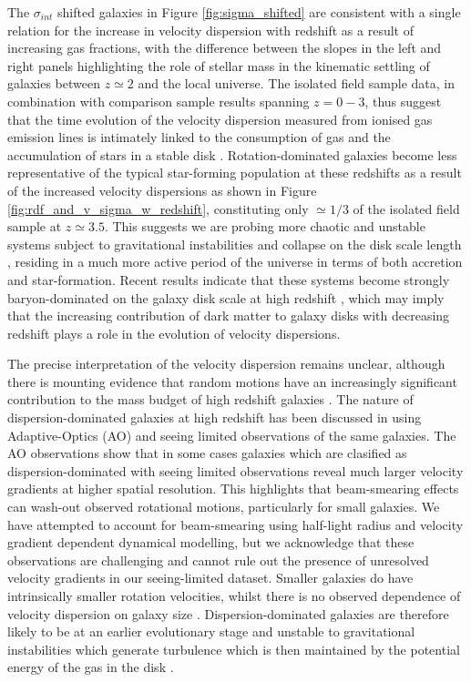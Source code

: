 \documentclass[fleqn,usenatbib]{mn2e}
\begin{document}
The $\sigma_{int}$ shifted galaxies in Figure \ref{fig:sigma_shifted} are consistent with a single relation for the increase in velocity dispersion with redshift as a result of increasing gas fractions, with the difference between the slopes in the left and right panels highlighting the role of stellar mass in the kinematic settling of galaxies between $z\simeq2$ and the local universe. 
The isolated field sample data, in combination with comparison sample results spanning $z=0-3$, thus suggest that the time evolution of the velocity dispersion measured from ionised gas emission lines is intimately linked to the consumption of gas and the accumulation of stars in a stable disk \citep[e.g.][]{Law2009,Law2012b,Law2012c,Wisnioski2015}.
Rotation-dominated galaxies become less representative of the typical star-forming population at these redshifts as a result of the increased velocity dispersions as shown in Figure \ref{fig:rdf_and_v_sigma_w_redshift}, constituting only $\simeq1/3$ of the isolated field sample at $z\simeq3.5$.
This suggests we are probing more chaotic and unstable systems subject to gravitational instabilities and collapse on the disk scale length \citep{Burkert2010,Genzel2011}, residing in a much more active period of the universe in terms of both accretion and star-formation.
Recent results indicate that these systems become strongly baryon-dominated on the galaxy disk scale at high redshift \citep{Ubler2017,Lang2017,Genzel2017}, which may imply that the increasing contribution of dark matter to galaxy disks with decreasing redshift plays a role in the evolution of velocity dispersions.   

The precise interpretation of the velocity dispersion remains unclear, although there is mounting evidence that random motions have an increasingly significant contribution to the mass budget of high redshift galaxies \citep[e.g.][]{Kassin2007,Law2009,Burkert2010,Kassin2012,Wuyts2016b,Lang2017,Ubler2017,Genzel2017}.
The nature of dispersion-dominated galaxies at high redshift has been discussed in \cite{Newman2013} using Adaptive-Optics (AO) and seeing limited observations of the same galaxies.
The AO observations show that in some cases galaxies which are clasified as dispersion-dominated with seeing limited observations reveal much larger velocity gradients at higher spatial resolution.
This highlights that beam-smearing effects can wash-out observed rotational motions, particularly for small galaxies.
We have attempted to account for beam-smearing using half-light radius and velocity gradient dependent dynamical modelling, but we acknowledge that these observations are challenging and cannot rule out the presence of unresolved velocity gradients in our seeing-limited dataset.
Smaller galaxies do have intrinsically smaller rotation velocities, whilst there is no observed dependence of velocity dispersion on galaxy size \citep[e.g.][]{Newman2013}.
Dispersion-dominated galaxies are therefore likely to be at an earlier evolutionary stage and unstable to gravitational instabilities which generate turbulence which is then maintained by the potential energy of the gas in the disk \citep{Burkert2010,Newman2013}.
\end{document}

